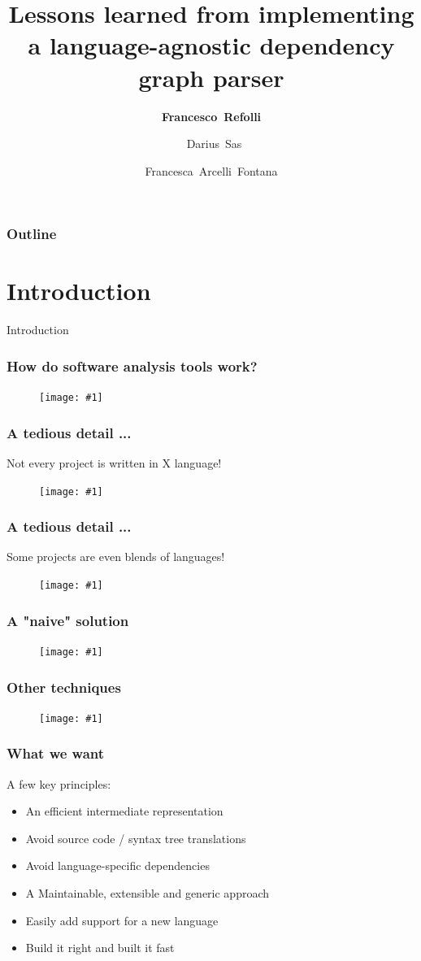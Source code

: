 \documentclass[table]{beamer}
\date[4 April 2025]{}
\title{Lessons learned from implementing a language-agnostic dependency graph parser}
\author[F.~Refolli \and ~D.~Sas \and F.~Arcelli~Fontana]{\textbf{Francesco~Refolli} \and ~Darius~Sas \and Francesca~Arcelli~Fontana}
\newcommand{\putimage}[2] {
  \begin{figure}[H]
    \centering
    \texttt{[image: \#1]}
	\end{figure}
}
\begin{document}
\frame{\titlepage}

\begin{frame}
\frametitle{Outline}
\tableofcontents
\end{frame}

\section{Introduction}
\begin{frame}
  \centering
  \huge Introduction
\end{frame}

\begin{frame}
  \frametitle{How do software analysis tools work?}
  \putimage{images/d2/software-analysis-tools.png}{0.99}
\end{frame}

\begin{frame}
  \frametitle{A tedious detail ...}
  Not every project is written in X language!
  \putimage{images/d2/the-tedious-detail-1.png}{0.99}
\end{frame}

\begin{frame}
  \frametitle{A tedious detail ...}
  Some projects are even blends of languages!
  \putimage{images/d2/the-tedious-detail-2.png}{0.99}
\end{frame}

\begin{frame}
  \frametitle{A "naive" solution}
  \putimage{images/d2/naive-solution.png}{0.99}
\end{frame}

\begin{frame}
  \frametitle{Other techniques}
  \putimage{images/d2/techniques.png}{0.99}
\end{frame}

\begin{frame}
  \frametitle{What we want}
  A few key principles:
  \begin{itemize}
    \item An efficient intermediate representation
    \item Avoid source code / syntax tree translations
    \item Avoid language-specific dependencies
    \item A Maintainable, extensible and generic approach
    \item Easily add support for a new language
    \item Build it right and built it fast
  \end{itemize}
\end{frame}
\end{document}
